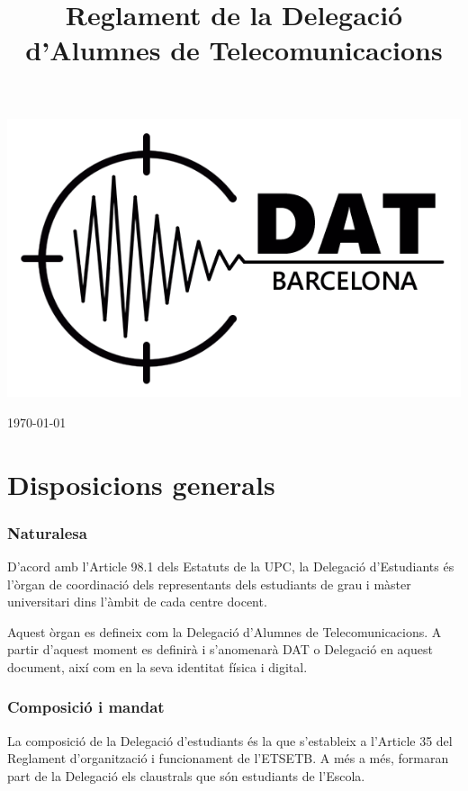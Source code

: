 \documentclass[a4paper,12pt]{article}
\title{Reglament de la Delegació d'Alumnes de Telecomunicacions}
\begin{document}
\thispagestyle{empty}
\begin{center}
\includegraphics[scale=0.8]{Dat_logo_10x6.png}
\vspace{3em}

\Huge
\@title
\vspace{1em}

\large
\today
\end{center}
\normalsize
\newpage

\thispagestyle{empty}
\tableofcontents
\newpage

\section{Disposicions generals}
\subsubsection{Naturalesa}
D'acord amb l'Article 98.1 dels Estatuts de la UPC, la Delegació d'Estudiants és l'òrgan de coordinació dels representants dels estudiants de grau i màster universitari dins l'àmbit de cada centre docent.

Aquest òrgan es defineix com la Delegació d'Alumnes de Telecomunicacions. A partir d'aquest moment es definirà i s'anomenarà DAT o Delegació en aquest document, així com en la seva identitat física i digital.

\subsubsection{Composició i mandat}
La composició de la Delegació d'estudiants és la que s'estableix a l'Article 35 del Reglament d'organització i funcionament de l'ETSETB. A més a més, formaran part de la Delegació els claustrals que són estudiants de l'Escola.
\end{document}
